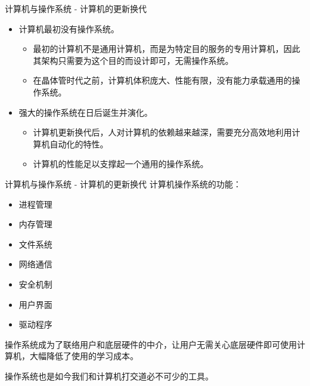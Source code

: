 \documentclass[UTF8]{ctexbeamer}
\begin{document}
\begin{frame}{计算机与操作系统 - 计算机的更新换代}
    
    \begin{itemize}
        \item 计算机最初没有操作系统。
        \begin{itemize}
            \item 最初的计算机不是通用计算机，而是为特定目的服务的专用计算机，因此其架构只需要为这个目的而设计即可，无需操作系统。
            \item 在晶体管时代之前，计算机体积庞大、性能有限，没有能力承载通用的操作系统。
        \end{itemize}
        \item 强大的操作系统在日后诞生并演化。
        \begin{itemize}
            \item 计算机更新换代后，人对计算机的依赖越来越深，需要充分高效地利用计算机自动化的特性。
            \item 计算机的性能足以支撑起一个通用的操作系统。
        \end{itemize}
    \end{itemize}
\end{frame}
\begin{frame}{计算机与操作系统 - 计算机的更新换代}
    计算机操作系统的功能：
    
    \begin{itemize}
        \item 进程管理
        \item 内存管理
        \item 文件系统
        \item 网络通信
        \item 安全机制
        \item 用户界面
        \item 驱动程序
    \end{itemize}
    \vspace{1em}
    操作系统成为了联络用户和底层硬件的中介，让用户无需关心底层硬件即可使用计算机，大幅降低了使用的学习成本。

    操作系统也是如今我们和计算机打交道必不可少的工具。
\end{frame}
\end{document}
